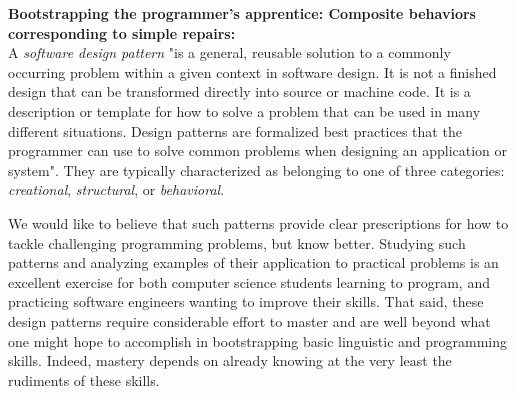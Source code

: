 {\bf{Bootstrapping the programmer's apprentice: Composite behaviors corresponding to simple repairs:}}\\

A {\it{software design pattern}} "is a general, reusable solution to a commonly occurring problem within a given context in software design. It is not a finished design that can be transformed directly into source or machine code. It is a description or template for how to solve a problem that can be used in many different situations. Design patterns are formalized best practices that the programmer can use to solve common problems when designing an application or system". They are typically characterized as belonging to one of three categories: {\it{creational}}, {\it{structural}}, or {\it{behavioral}}.

We would like to believe that such patterns provide clear prescriptions for how to tackle challenging programming problems, but know better. Studying such patterns and analyzing examples of their application to practical problems is an excellent exercise for both computer science students learning to program, and practicing software engineers wanting to improve their skills. That said, these design patterns require considerable effort to master and are well beyond what one might hope to accomplish in bootstrapping basic linguistic and programming skills. Indeed, mastery depends on already knowing \emdash{} at the very least \emdash{} the rudiments of these skills. 



